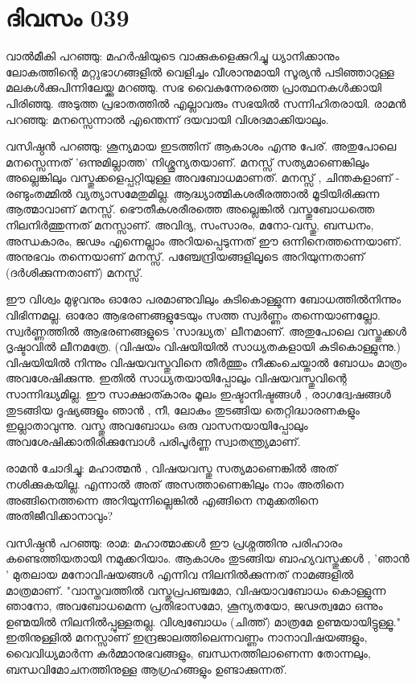  
\section{ദിവസം 039}


വാല്‍മീകി പറഞ്ഞു: മഹര്‍ഷിയുടെ വാക്കുകളെക്കുറിച്ചു ധ്യാനിക്കാനും ലോകത്തിന്റെ മറ്റുഭാഗങ്ങളില്‍ വെളിച്ചം വീശാനുമായി സൂര്യന്‍ പടിഞ്ഞാറുള്ള മലകള്‍ക്കുപിന്നിലേയ്ക്കു മറഞ്ഞു. സഭ വൈകുന്നേരത്തെ പ്രാത്ഥനകള്‍ക്കായി പിരിഞ്ഞു. അടുത്ത പ്രഭാതത്തില്‍ എല്ലാവരും സഭയില്‍ സന്നിഹിതരായി. രാമന്‍ പറഞ്ഞു: മനസ്സെന്നാല്‍ എന്തെന്ന് ദയവായി വിശദമാക്കിയാലും.

വസിഷ്ഠന്‍ പറഞ്ഞു: ശൂന്യമായ ഇടത്തിന്‌ ആകാശം എന്നു പേര്‌. അതുപോലെ മനസ്സെന്നത്‌  'ഒന്നുമില്ലാത്ത' നിശ്ശൂന്യതയാണ്‌. മനസ്സ്‌ സത്യമാണെങ്കിലും അല്ലെങ്കിലും വസ്തുക്കളെപ്പറ്റിയുള്ള അവബോധമാണത്‌. മനസ്സ്‌ , ചിന്തകളാണ്‌ - രണ്ടുംതമ്മില്‍ വ്യത്യാസമേതുമില്ല. ആദ്ധ്യാത്മികശരീരത്താല്‍ മൂടിയിരിക്കുന്ന ആത്മാവാണ്‌ മനസ്സ്‌. ഭൌതീകശരീരത്തെ അല്ലെങ്കില്‍ വസ്തുബോധത്തെ നിലനിര്‍ത്തുന്നത്‌ മനസ്സാണ്‌. അവിദ്യ, സംസാരം, മനോ-വസ്തു, ബന്ധനം, അന്ധകാരം, ജഢം എന്നെല്ലാം അറിയപ്പെടുന്നത്‌ ഈ ഒന്നിനെത്തന്നെയാണ്‌. അനുഭവം തന്നെയാണ്‌ മനസ്സ്‌. പഞ്ചേന്ദ്രിയങ്ങളിലൂടെ അറിയുന്നതാണ്‌ (ദര്‍ശിക്കുന്നതാണ്‌) മനസ്സ്‌.

ഈ വിശ്വം മുഴുവനും ഓരോ പരമാണുവിലും കുടികൊള്ളുന്ന ബോധത്തില്‍നിന്നും വിഭിന്നമല്ല. ഓരോ ആഭരണങ്ങളുടേയും സത്ത സ്വര്‍ണ്ണം തന്നെയാണല്ലോ. സ്വര്‍ണ്ണത്തില്‍ ആഭരണങ്ങളുടെ 'സാദ്ധ്യത' ലീനമാണ്‌. അതുപോലെ വസ്തുക്കള്‍ ദൃഷ്ടാവില്‍ ലീനമത്രേ. (വിഷയം വിഷയിയില്‍ സാധ്യതകളായി കുടികൊള്ളുന്നു.) വിഷയിയില്‍ നിന്നും വിഷയവസ്തുവിനെ തീര്‍ത്തും നീക്കംചെയ്താല്‍ ബോധം മാത്രം അവശേഷിക്കുന്നു. ഇതില്‍ സാധ്യതയായിപ്പോലും വിഷയവസ്തുവിന്റെ സാന്നിദ്ധ്യമില്ല. ഈ സാക്ഷാത്കാരം മൂലം ഇഷ്ടാനിഷ്ടങ്ങള്‍ , രാഗദ്വേഷങ്ങള്‍ തുടങ്ങിയ ദൂഷ്യങ്ങളും ഞാന്‍ , നീ, ലോകം തുടങ്ങിയ തെറ്റിദ്ധാരണകളും ഇല്ലാതാവുന്നു. വസ്തു അവബോധം ഒരു വാസനയായിപ്പോലും അവശേഷിക്കാതിരിക്കുമ്പോള്‍ പരിപൂര്‍ണ്ണ സ്വാതന്ത്ര്യമാണ്‌. 

രാമന്‍ ചോദിച്ചു: മഹാത്മന്‍ , വിഷയവസ്തു സത്യമാണെങ്കില്‍ അത്‌ നശിക്കുകയില്ല. എന്നാല്‍ അത്‌ അസത്താണെങ്കിലും നാം അതിനെ അങ്ങിനെത്തന്നെ അറിയുന്നില്ലെങ്കില്‍ എങ്ങിനെ  നമുക്കതിനെ അതിജീവിക്കാനാവും?

വസിഷ്ഠന്‍ പറഞ്ഞു: രാമ: മഹാത്മാക്കള്‍ ഈ പ്രശ്നത്തിനു പരിഹാരം കണ്ടെത്തിയതായി നമുക്കറിയാം. ആകാശം തുടങ്ങിയ ബാഹ്യവസ്തുക്കള്‍ , 'ഞാന്‍ ' മുതലായ മനോവിഷയങ്ങള്‍ എന്നിവ നിലനില്‍ക്കുന്നത്‌ നാമങ്ങളില്‍ മാത്രമാണ്‌. "വാസ്തവത്തില്‍ വസ്തുപ്രപഞ്ചമോ, വിഷയാവബോധം കൊള്ളുന്ന ഞാനോ, അവബോധമെന്ന പ്രതിഭാസമോ, ശൂന്യതയോ, ജഢത്വമോ ഒന്നും ഉണ്മയില്‍ നിലനില്‍പ്പുള്ളതല്ല. വിശ്വബോധം (ചിത്ത്‌) മാത്രമേ ഉണ്മയായിട്ടുള്ളൂ." ഇതിനുള്ളില്‍ മനസ്സാണ്‌ ഇന്ദ്രജാലത്തിലെന്നവണ്ണം നാനാവിഷയങ്ങളും, വൈവിധ്യമാര്‍ന്ന കര്‍മ്മാനുഭവങ്ങളും, ബന്ധനത്തിലാണെന്ന തോന്നലും, ബന്ധവിമോചനത്തിനുള്ള ആഗ്രഹങ്ങളും ഉണ്ടാക്കുന്നത്‌. 
